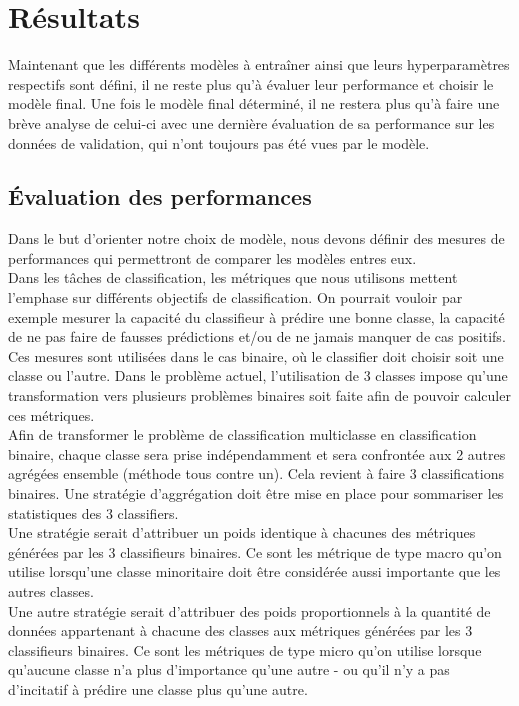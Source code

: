 \section{Résultats}
Maintenant que les différents modèles à entraîner ainsi que leurs hyperparamètres respectifs sont défini, il ne reste plus qu'à évaluer leur performance et choisir le modèle final. Une fois le modèle final déterminé, il ne restera plus qu'à faire une brève analyse de celui-ci avec une dernière évaluation de sa performance sur les données de validation, qui n'ont toujours pas été vues par le modèle.  


\subsection{Évaluation des performances}
Dans le but d'orienter notre choix de modèle, nous devons définir des mesures de performances qui permettront de comparer les modèles entres eux. \\

Dans les tâches de classification, les métriques que nous utilisons mettent l'emphase sur différents objectifs de classification. On pourrait vouloir par exemple mesurer la capacité du classifieur à prédire une bonne classe, la capacité de ne pas faire de fausses prédictions et/ou de ne jamais manquer de cas positifs. Ces mesures sont utilisées dans le cas binaire, où le classifier doit choisir soit une classe ou l'autre. Dans le  problème actuel, l'utilisation de 3 classes impose qu'une transformation vers plusieurs problèmes binaires soit faite afin de pouvoir calculer ces métriques. \\

Afin de transformer le problème de classification multiclasse en classification binaire, chaque classe sera prise indépendamment et sera confrontée aux 2 autres agrégées ensemble (méthode tous contre un). Cela revient à faire 3 classifications binaires. Une stratégie d'aggrégation doit être mise en place pour sommariser les statistiques des 3 classifiers. \\ Une stratégie serait d'attribuer un poids identique à chacunes des métriques générées par les 3 classifieurs binaires. Ce sont les métrique de type macro qu'on utilise lorsqu'une classe minoritaire doit être considérée aussi importante que les autres classes. \\ Une autre stratégie serait d'attribuer des poids proportionnels à la quantité de données appartenant à chacune des classes aux métriques générées par les 3 classifieurs binaires. Ce sont les métriques de type micro qu'on utilise lorsque qu'aucune classe n'a plus d'importance qu'une autre - ou qu'il n'y a pas d'incitatif à prédire une classe plus qu'une autre. \\

